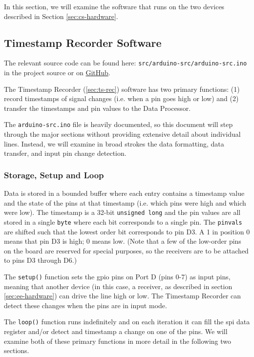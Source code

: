\documentclass[12pt]{article}
\begin{document}
In this section, we will examine the software that runs on the two devices
described in Section \ref{sec:cs-hardware}.

\subsection{Timestamp Recorder Software}\label{sec:ts-rec-sw}

The relevant source code can be found here:
\texttt{src/arduino-src/arduino-src.ino} in the project source or on
\href{https://github.com/cabeese/crab-tracker/tree/master/src/arduino-src}
{GitHub}.


The Timestamp Recorder (\ref{sec:ts-rec}) software has two primary functions:
(1) record timestamps of signal changes (i.e. when a pin goes high or low) and
(2) transfer the timestamps and pin values to the Data Processor.

The \texttt{arduino-src.ino} file is heavily documented, so this document
will step through the major sections without providing extensive detail about
individual lines.
Instead, we will examine in broad strokes the data formatting, data
transfer, and input pin change detection.

\subsubsection{Storage, Setup and Loop}

Data is stored in a bounded buffer where each entry contains a timestamp value
and the state of the pins at that timestamp (i.e. which pins were high and
which were low).
The timestamp is a 32-bit \texttt{unsigned long} and the pin values are
all stored in a single \texttt{byte} where each bit corresponds to a single
pin.
The \texttt{pinvals} are shifted such that the lowest order bit corresponds
to pin D3.
A 1 in position 0 means that pin D3 is high; 0 means low.
(Note that a few of the low-order pins on the board are reserved for special
purposes, so the receivers are to be attached to pins D3 through D6.)

The \texttt{setup()} function sets the \gls{gpio} pins on Port D (pins 0-7)
as input pins, meaning that another device (in this case, a receiver, as
described in section \ref{sec:ee-hardware}) can drive the line high or low.
The Timestamp Recorder can detect these changes when the pins are in input
mode.

The \texttt{loop()} function runs indefinitely and on each iteration it can fill
the \gls{spi} data register and/or detect and timestamp a change on one of the
pins.
We will examine both of these primary functions in more detail in the following
two sections.
\end{document}

